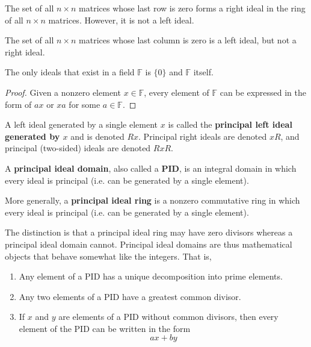     \begin{example}
      The set of all $n \times n$ matrices whose last row is zero forms a right ideal in the ring of all $n \times n$ matrices. However, it is not a left ideal.

      The set of all $n\times n$ matrices whose last column is zero is a left ideal, but not a right ideal. 
    \end{example}

    \begin{proposition}
      The only ideals that exist in a field $\mathbb{F}$ is $\{0\}$ and $\mathbb{F}$ itself. 
    \end{proposition}
    \begin{proof}
      Given a nonzero element $x \in \mathbb{F}$, every element of $\mathbb{F}$ can be expressed in the form of $a x$ or $x a$ for some $a \in \mathbb{F}$. 
    \end{proof}

    \begin{definition}
      A left ideal generated by a single element $x$ is called the \textbf{principal left ideal generated by $x$} and is denoted $R x$. Principal right ideals are denoted $x R$, and principal (two-sided) ideals are denoted $R x R$. 
    \end{definition}

    \begin{definition}
      A \textbf{principal ideal domain}, also called a \textbf{PID}, is an integral domain in which every ideal is principal (i.e. can be generated by a single element). 

      More generally, a \textbf{principal ideal ring} is a nonzero commutative ring in which every ideal is principal (i.e. can be generated by a single element). 
    \end{definition}

    The distinction is that a principal ideal ring may have zero divisors whereas a principal ideal domain cannot. Principal ideal domains are thus mathematical objects that behave somewhat like the integers. That is, 
    \begin{enumerate}
      \item Any element of a PID has a unique decomposition into prime elements. 
      \item Any two elements of a PID have a greatest common divisor. 
      \item If $x$ and $y$ are elements of a PID without common divisors, then every element of the PID can be written in the form 
        \begin{equation}
          a x + b y
        \end{equation}
    \end{enumerate}

